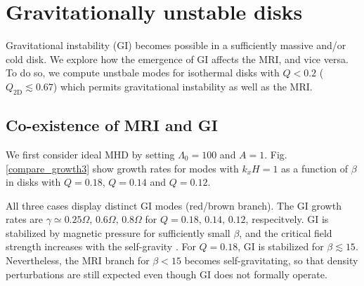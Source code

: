 \section{Gravitationally unstable disks} \label{result2}
Gravitational instability (GI) becomes possible in a sufficiently
massive and/or cold disk. We explore how the emergence of GI affects
the MRI, and vice versa. To do so, we compute unstbale modes for  
isothermal disks with $Q < 0.2 $ ($Q_\mathrm{2D}\lesssim 0.67$) which
permits gravitational instability as well as the MRI.  

\subsection{Co-existence of MRI and GI}
We first consider ideal MHD by setting $\Lambda_0=100$ and $A=1$. 
Fig. \ref{compare_growth3} show growth rates for 
modes with $k_xH=1$ as a function of $\beta$ in disks with $Q=0.18$,
$Q=0.14$ and $Q=0.12$. 

All three cases display distinct GI modes (red/brown branch). The GI
growth rates are $\gamma\simeq 0.25\Omega,\,0.6\Omega,\,0.8\Omega$ for
$Q=0.18,\,0.14,\,0.12$, respecitvely. GI is stabilized by magnetic
pressure for sufficiently small $\beta$, and the critical field
strength increases with the self-gravity \citep{nakamura83}. For
$Q=0.18$, GI is stabilized for $\beta \lesssim 15$. Nevertheless, 
the MRI branch for $\beta < 15$ becomes self-gravitating, so that
density perturbations are still expected even though  GI does not
formally operate.  


